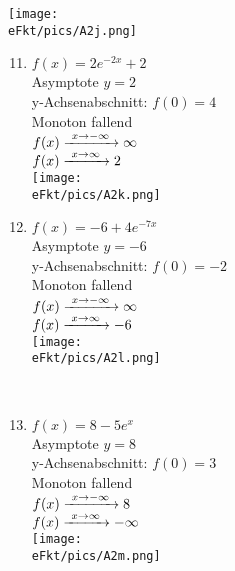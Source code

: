 \begin{Answer}[ref=eFktA2]
\begin{minipage}{\textwidth}
\begin{minipage}[t]{0.49\textwidth}
\begin{enumerate}[label=\alph*)]
				\texttt{[image: \\eFkt/pics/A2j.png]}
			\end{enumerate}
		\end{minipage}
		\begin{minipage}[t]{0.49\textwidth}
			\begin{enumerate}[label=\alph*)]
				\setcounter{enumi}{10}
				\item \(f(x)=2e^{-2x}+2\)\\
				Asymptote \(y=2\)\\
				y-Achsenabschnitt: \(f(0)=4\)\\
				Monoton fallend\\
				\(f(x)\xrightarrow{\hphantom{\ }x\to-\infty\hphantom{\ }}\infty\)\\
				\(f(x)\xrightarrow{\hphantom{\ }x\to\infty\hphantom{\ }}2\)\\
				\texttt{[image: \\eFkt/pics/A2k.png]}
				\item \(f(x)=-6+4e^{-7x}\)\\
				Asymptote \(y=-6\)\\
				y-Achsenabschnitt: \(f(0)=-2\)\\
				Monoton fallend\\
				\(f(x)\xrightarrow{\hphantom{\ }x\to-\infty\hphantom{\ }}\infty\)\\
				\(f(x)\xrightarrow{\hphantom{\ }x\to\infty\hphantom{\ }}-6\)\\
				\texttt{[image: \\eFkt/pics/A2l.png]}
			\end{enumerate}
		\end{minipage}
	\end{minipage}\\
	\newpage
	\begin{minipage}{\textwidth}
		\begin{minipage}[t]{0.49\textwidth}
			\begin{enumerate}[label=\alph*)]
				\setcounter{enumi}{12}
				\item \(f(x)=8-5e^{x}\)\\
				Asymptote \(y=8\)\\
				y-Achsenabschnitt: \(f(0)=3\)\\
				Monoton fallend\\
				\(f(x)\xrightarrow{\hphantom{\ }x\to-\infty\hphantom{\ }}8\)\\
				\(f(x)\xrightarrow{\hphantom{\ }x\to\infty\hphantom{\ }}-\infty\)\\
				\texttt{[image: \\eFkt/pics/A2m.png]}

\end{enumerate}
\end{minipage}
\end{minipage}
\end{Answer}
